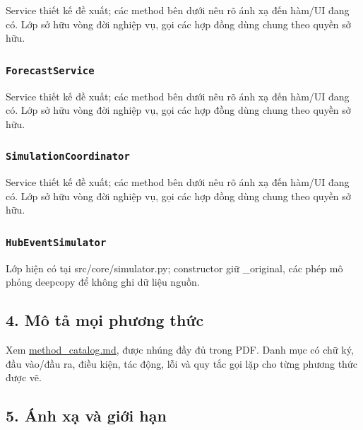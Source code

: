 \documentclass[11pt,a4paper]{article}
\begin{document}
Service thiết kế đề xuất; các method bên dưới nêu rõ ánh xạ đến hàm/UI
đang có. Lớp sở hữu vòng đời nghiệp vụ, gọi các hợp đồng dùng chung theo
quyền sở hữu.

\hypertarget{forecastservice}{%
\subsubsection{\texorpdfstring{\texttt{ForecastService}}{ForecastService}}\label{forecastservice}}

Service thiết kế đề xuất; các method bên dưới nêu rõ ánh xạ đến hàm/UI
đang có. Lớp sở hữu vòng đời nghiệp vụ, gọi các hợp đồng dùng chung theo
quyền sở hữu.

\hypertarget{simulationcoordinator}{%
\subsubsection{\texorpdfstring{\texttt{SimulationCoordinator}}{SimulationCoordinator}}\label{simulationcoordinator}}

Service thiết kế đề xuất; các method bên dưới nêu rõ ánh xạ đến hàm/UI
đang có. Lớp sở hữu vòng đời nghiệp vụ, gọi các hợp đồng dùng chung theo
quyền sở hữu.

\hypertarget{hubeventsimulator}{%
\subsubsection{\texorpdfstring{\texttt{HubEventSimulator}}{HubEventSimulator}}\label{hubeventsimulator}}

Lớp hiện có tại src/core/simulator.py; constructor giữ \_original, các
phép mô phỏng deepcopy để không ghi dữ liệu nguồn.

\hypertarget{muxf4-tux1ea3-mux1ecdi-phux1b0ux1a1ng-thux1ee9c}{%
\subsection{4. Mô tả mọi phương
thức}\label{muxf4-tux1ea3-mux1ecdi-phux1b0ux1a1ng-thux1ee9c}}

Xem \url{method_catalog.md}, được nhúng đầy đủ trong PDF. Danh mục có
chữ ký, đầu vào/đầu ra, điều kiện, tác động, lỗi và quy tắc gọi lặp cho
từng phương thức được vẽ.

\hypertarget{uxe1nh-xux1ea1-vuxe0-giux1edbi-hux1ea1n}{%
\subsection{5. Ánh xạ và giới
hạn}\label{uxe1nh-xux1ea1-vuxe0-giux1edbi-hux1ea1n}}
\end{document}
